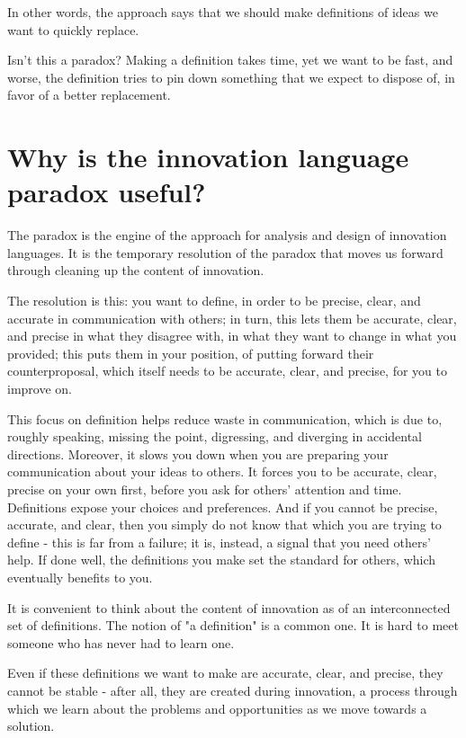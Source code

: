 In other words, the approach says that we should make definitions of ideas we want to quickly replace. 

Isn't this a paradox? Making a definition takes time, yet we want to be fast, and worse, the definition tries to pin down something that we expect to dispose of, in favor of a better replacement.

\section{Why is the innovation language paradox useful?}
\label{c3:s2}
The paradox is the engine of the approach for analysis and design of innovation languages. It is the temporary resolution of the paradox that moves us forward through cleaning up the content of innovation. 

The resolution is this: you want to define, in order to be precise, clear, and accurate in communication with others; in turn, this lets them be accurate, clear, and precise in what they disagree with, in what they want to change in what you provided; this puts them in your position, of putting forward their counterproposal, which itself needs to be accurate, clear, and precise, for you to improve on. 

This focus on definition helps reduce waste in communication, which is due to, roughly speaking, missing the point, digressing, and diverging in accidental directions. Moreover, it slows you down when you are preparing your communication about your ideas to others. It forces you to be accurate, clear, precise on your own first, before you ask for others' attention and time. Definitions expose your choices and preferences. And if you cannot be precise, accurate, and clear, then you simply do not know that which you are trying to define - this is far from a failure; it is, instead, a signal that you need others' help. If done well, the definitions you make set the standard for others, which eventually benefits to you.

It is convenient to think about the content of innovation as of an interconnected set of definitions. The notion of "a definition" is a common one. It is hard to meet someone who has never had to learn one. 

Even if these definitions we want to make are accurate, clear, and precise, they cannot be stable - after all, they are created during innovation, a process through which we learn about the problems and opportunities as we move towards a solution. 

